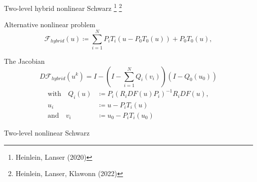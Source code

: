 \begin{frame}{Two-level hybrid nonlinear Schwarz  \footnote[2]{\tiny Heinlein, Lanser (2020)} \footnote[3]{\tiny Heinlein, Lanser, Klawonn (2022)}}
	\vspace*{-5mm}
	\begin{block}{\normalsize Alternative nonlinear problem}
		\begin{equation*}
			\mathcal{F}_{hybrid}(u) \coloneqq \sum_{i=1}^NP_iT_i(u-P_0T_0(u)) + P_0T_0(u),
		\end{equation*}
	\end{block}
	\begin{block}{\normalsize The Jacobian}
		\vspace*{-2mm}
		\begin{equation*}
			D\mathcal{F}_{hybrid}(u^k) = I - \left(I-\sum_{i=1}^NQ_i(v_i)\right)(I-Q_0(u_0))
		\end{equation*}
		\begin{align*}
			\text{with}\quad Q_i(u) & \coloneqq P_i(R_iDF(u)P_i)^{-1}R_iDF(u), \\
			u_i                     & \coloneqq u-P_iT_i(u)                    \\
			\text{and}\quad v_i     & \coloneqq u_0-P_iT_i(u_0)
		\end{align*}
	\end{block}
\end{frame}

\begin{frame}{Two-level nonlinear Schwarz}%
	
\end{frame}
